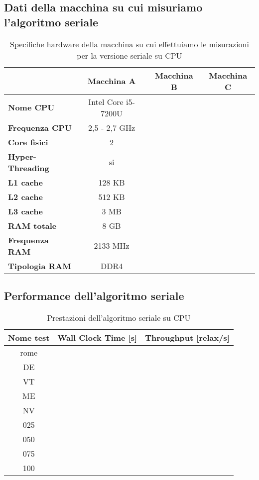 \documentclass[a4paper]{article}
\begin{document}
	\subsection{Dati della macchina su cui misuriamo l'algoritmo seriale}
	\begin{table}[!ht]
		\centering
		\begin{tabular}{|l|c|c|c|}
			 & \textbf{Macchina A} & \textbf{Macchina B} & \textbf{Macchina C} \\ \hline
			\textbf{Nome CPU} & Intel Core i5-7200U & & \\ \hline
			\textbf{Frequenza CPU} & 2,5 - 2,7 GHz & & \\ \hline
			\textbf{Core fisici} & 2 & & \\ \hline
			\textbf{Hyper-Threading} & si & & \\ \hline
			\textbf{L1 cache} & 128 KB & & \\ \hline
			\textbf{L2 cache} & 512 KB & & \\ \hline
			\textbf{L3 cache} & 3 MB & & \\ \hline
			\textbf{RAM totale} & 8 GB & & \\ \hline
			\textbf{Frequenza RAM} & 2133 MHz & & \\ \hline
			\textbf{Tipologia RAM} & DDR4 & & \\ \hline
		\end{tabular}
		\label{tab:specs_serial_cpu}
		\caption{Specifiche hardware della macchina su cui effettuiamo le misurazioni per la versione seriale su CPU}
	\end{table}

	\subsection{Performance dell'algoritmo seriale}
	\begin{table}[!ht]
		\centering
		\begin{tabular}{|c|c|c|}
			\hline
			\textbf{Nome test} & \textbf{Wall Clock Time [s]} & \textbf{Throughput [relax/s]} \\ \hline
			       rome & & \\ \hline
			        DE & & \\ \hline
			        VT & & \\ \hline
			        ME & & \\ \hline
			        NV & & \\ \hline
			        025 & & \\ \hline
			        050 & & \\ \hline
			        075 & & \\ \hline
			        100 & & \\ \hline
		\end{tabular}
		\label{tab:performance_serial}
		\caption{Prestazioni dell'algoritmo seriale su CPU}
	\end{table}
	
\end{document}
